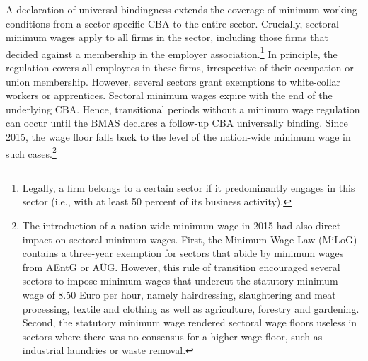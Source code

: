 \documentclass[11pt,oneside,reqno,xcolor=dvipsnames]{article} %
\begin{document}
A declaration of universal bindingness extends the coverage of minimum working conditions from a sector-specific CBA to the entire sector. Crucially, sectoral minimum wages apply to all firms in the sector, including those firms that decided against a membership in the employer association.\footnote{Legally, a firm belongs to a certain sector if it predominantly engages in this sector (i.e., with at least 50 percent of its business activity).} In principle, the regulation covers all employees in these firms, irrespective of their occupation or union membership. However, several sectors grant exemptions to white-collar workers or apprentices. Sectoral minimum wages expire with the end of the underlying CBA. Hence, transitional periods without a minimum wage regulation can occur until the BMAS declares a follow-up CBA universally binding. Since 2015, the wage floor falls back to the level of the nation-wide minimum wage in such cases.\footnote{The introduction of a nation-wide minimum wage in 2015 had also direct impact on sectoral minimum wages. First, the Minimum Wage Law (MiLoG) contains a three-year exemption for sectors that abide by minimum wages from AEntG or AÜG. However, this rule of transition encouraged several sectors to impose minimum wages that undercut the statutory minimum wage of 8.50 Euro per hour, namely hairdressing, slaughtering and meat processing, textile and clothing as well as agriculture, forestry and gardening. Second, the statutory minimum wage rendered sectoral wage floors useless in sectors where there was no consensus for a higher wage floor, such as industrial laundries or waste removal.}
\end{document}
